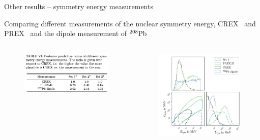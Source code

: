 \documentclass[usenames,dvipsnames,t]{beamer}
\begin{document}
\begin{frame}{Other results -- symmetry energy measurements}


  Comparing different measurements of the nuclear symmetry energy, CREX~\cite{CREX:2022kgg} and PREX~\cite{PREX:2021umo} and the dipole measurement of ${}^{208}\rm{Pb}$ ~\cite{Tamii:2011pv}

  \begin{columns}

    \begin{figure}
      \centering
      \includegraphics[width=0.95\linewidth]{Figures/table_PREX_CREX.jpg}
    \end{figure}


    \begin{figure}
      \centering
      \includegraphics[width=0.95\linewidth]{Figures/figure_PREX_CREX_v2.jpg}
    \end{figure}
  \end{columns}
  
\end{frame}
\end{document}
